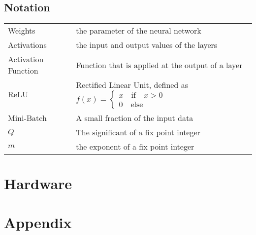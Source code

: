 \documentclass[a4paper]{article}
\begin{document}
\subsection*{Notation}
\begin{center}
\begin{tabular}{lp{3.5in}}
	Weights 	& the parameter of the neural network		\\
	Activations	& the input and output values of the layers	\\
	Activation Function & Function that is applied at the output of a layer \\
	ReLU		& Rectified Linear Unit, defined as  $f(x) = \begin{cases}
		x \quad \text{if} \quad x > 0 \\
		0 \quad \text{else}
	\end{cases}$						\\
	Mini-Batch	& A small fraction of the input data \\
	$Q$			& The significant of a fix point integer 	\\
	$m$			& the exponent of a fix point integer		
\end{tabular}
\end{center}









\section{Hardware}










\section{Appendix}








\listoffigures
\listoftables
\listoftodos
\end{document}
